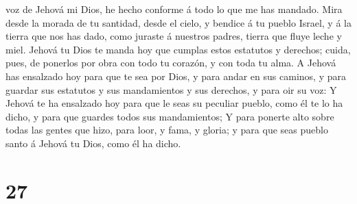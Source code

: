 voz de Jehová mi Dios, he hecho conforme á todo lo que me has mandado.
 Mira desde la morada de tu santidad, desde el cielo, y
bendice á tu pueblo Israel, y á la tierra que nos has dado, como juraste
á nuestros padres, tierra que fluye leche y miel.  Jehová
tu Dios te manda hoy que cumplas estos estatutos y derechos; cuida,
pues, de ponerlos por obra con todo tu corazón, y con toda tu alma.
 A Jehová has ensalzado hoy para que te sea por Dios, y
para andar en sus caminos, y para guardar sus estatutos y sus
mandamientos y sus derechos, y para oir su voz:  Y Jehová
te ha ensalzado hoy para que le seas su peculiar pueblo, como él te lo
ha dicho, y para que guardes todos sus mandamientos;  Y
para ponerte alto sobre todas las gentes que hizo, para loor, y fama, y
gloria; y para que seas pueblo santo á Jehová tu Dios, como él ha dicho.

\hypertarget{section-26}{%
\section{27}\label{section-26}}

